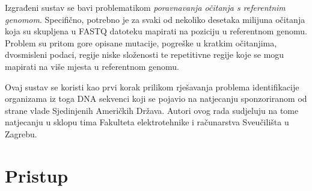 \documentclass[times, utf8, diplomski]{fer}
\begin{document}
Izgrađeni sustav se bavi problematikom \emph{poravnavanja očitanja s referentnim genomom}. Specifično, potrebno
je za svaki od nekoliko desetaka milijuna očitanja koja su skupljena u FASTQ datoteku mapirati na poziciju u
referentnom genomu. Problem su pritom gore opisane mutacije, pogreške u kratkim očitanjima, dvosmisleni podaci,
regije niske složenosti te repetitivne regije koje se mogu mapirati na više mjesta u referentnom genomu.

Ovaj sustav se koristi kao prvi korak prilikom rješavanja problema identifikacije organizama iz toga DNA sekvenci
koji se pojavio na natjecanju sponzoriranom od strane vlade Sjedinjenih Američkih Država. Autori ovog rada sudjeluju
na tome natjecanju u sklopu tima Fakulteta elektrotehnike i računarstva Sveučilišta u Zagrebu.




\chapter{Pristup}
\end{document}
